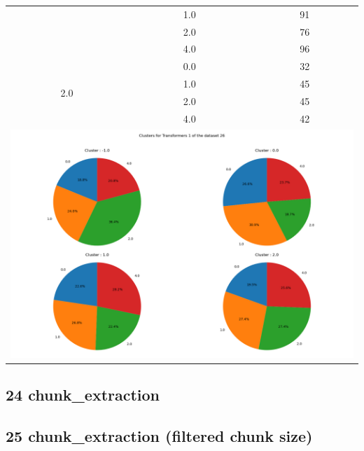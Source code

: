 \begin{longtable}{|c|c|c|c|c|}
& \multicolumn{2}{c|}{1.0} & \multicolumn{2}{c|}{91} \\
& \multicolumn{2}{c|}{2.0} & \multicolumn{2}{c|}{76} \\
& \multicolumn{2}{c|}{4.0} & \multicolumn{2}{c|}{96} \\
\hline
\multirow{4}{*}{2.0} & \multicolumn{2}{c|}{0.0} & \multicolumn{2}{c|}{32} \\
& \multicolumn{2}{c|}{1.0} & \multicolumn{2}{c|}{45} \\
& \multicolumn{2}{c|}{2.0} & \multicolumn{2}{c|}{45} \\
& \multicolumn{2}{c|}{4.0} & \multicolumn{2}{c|}{42} \\
\hline
\multicolumn{5}{|c|}{\includegraphics[width=0.8\linewidth]{img/annexes/26/clustering_pie_charts/Transformers 1.png}} \\
\end{longtable}


\subsection{24 chunk\_extraction}

\subsection{25 chunk\_extraction (filtered chunk size)}

